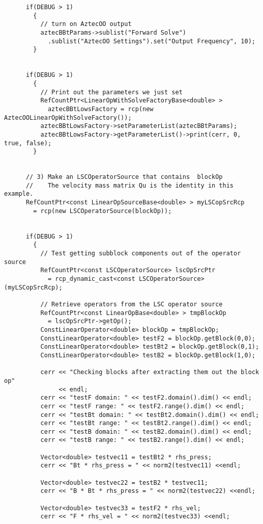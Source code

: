 \begin{verbatim}
      if(DEBUG > 1)
        {
          // turn on AztecOO output
          aztecBBtParams->sublist("Forward Solve")
            .sublist("AztecOO Settings").set("Output Frequency", 10);
        }


      if(DEBUG > 1)
        {
          // Print out the parameters we just set
          RefCountPtr<LinearOpWithSolveFactoryBase<double> > 
            aztecBBtLowsFactory = rcp(new AztecOOLinearOpWithSolveFactory());
          aztecBBtLowsFactory->setParameterList(aztecBBtParams);
          aztecBBtLowsFactory->getParameterList()->print(cerr, 0, true, false);
        }


      // 3) Make an LSCOperatorSource that contains  blockOp
      //    The velocity mass matrix Qu is the identity in this example.
      RefCountPtr<const LinearOpSourceBase<double> > myLSCopSrcRcp 
        = rcp(new LSCOperatorSource(blockOp));


      if(DEBUG > 1) 
        {
          // Test getting subblock components out of the operator source
          RefCountPtr<const LSCOperatorSource> lscOpSrcPtr 
            = rcp_dynamic_cast<const LSCOperatorSource>(myLSCopSrcRcp);  
	  
          // Retrieve operators from the LSC operator source
          RefCountPtr<const LinearOpBase<double> > tmpBlockOp 
            = lscOpSrcPtr->getOp();
          ConstLinearOperator<double> blockOp = tmpBlockOp;
          ConstLinearOperator<double> testF2 = blockOp.getBlock(0,0);
          ConstLinearOperator<double> testBt2 = blockOp.getBlock(0,1);
          ConstLinearOperator<double> testB2 = blockOp.getBlock(1,0);	 
	  
          cerr << "Checking blocks after extracting them out the block op"
               << endl;
          cerr << "testF domain: " << testF2.domain().dim() << endl;
          cerr << "testF range: " << testF2.range().dim() << endl;
          cerr << "testBt domain: " << testBt2.domain().dim() << endl;
          cerr << "testBt range: " << testBt2.range().dim() << endl;
          cerr << "testB domain: " << testB2.domain().dim() << endl;
          cerr << "testB range: " << testB2.range().dim() << endl;

          Vector<double> testvec11 = testBt2 * rhs_press;
          cerr << "Bt * rhs_press = " << norm2(testvec11) <<endl;
	  
          Vector<double> testvec22 = testB2 * testvec11;
          cerr << "B * Bt * rhs_press = " << norm2(testvec22) <<endl;
	  
          Vector<double> testvec33 = testF2 * rhs_vel;
          cerr << "F * rhs_vel = " << norm2(testvec33) <<endl;
	  

\end{verbatim}
